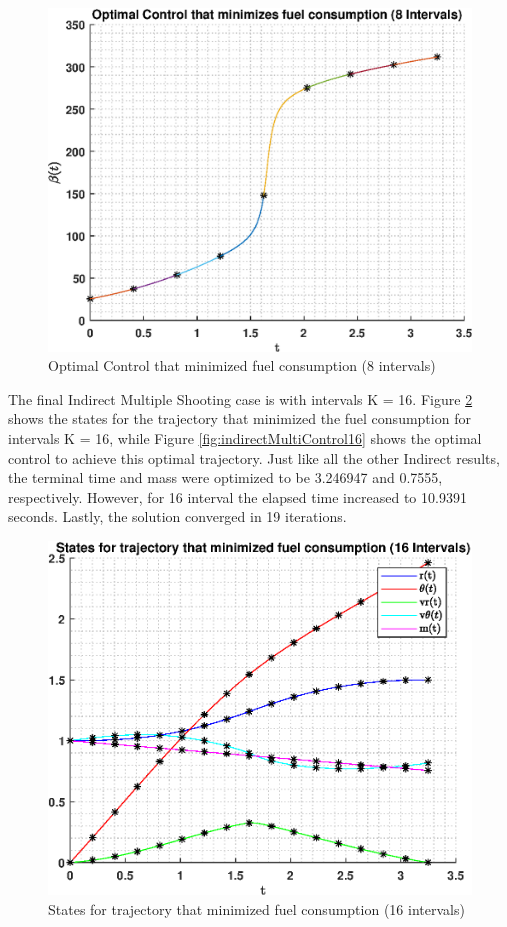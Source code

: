 \documentclass[]{article}
\begin{document}
\begin{figure}
	\centering
	\includegraphics[scale=0.75]{indirectMultiControl8.eps}
	\caption{Optimal Control that minimized fuel consumption (8 intervals)}
	\label{fig:indirectMultiControl8}
\end{figure}
\vspace{2mm}\newline 
The final Indirect Multiple Shooting case is with intervals K = 16. Figure \ref{fig:indirectMultiStates16} shows the states for the trajectory that minimized the fuel consumption for intervals K = 16, while Figure \ref{fig:indirectMultiControl16} shows the optimal control to achieve this optimal trajectory. Just like all the other Indirect results, the terminal time and mass were optimized to be 3.246947 and 0.7555, respectively. However, for 16 interval the elapsed time increased to 10.9391 seconds. Lastly, the solution converged in 19 iterations.
\begin{figure}
	\centering
	\includegraphics[scale=0.75]{indirectMultiStates16.eps}
	\caption{States for trajectory that minimized fuel consumption (16 intervals)}
	\label{fig:indirectMultiStates16}
\end{figure}
\end{document}
